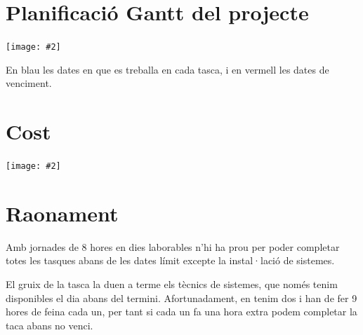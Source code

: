 \documentclass[a4paper,12pt]{article}
\newcommand{\mygraphic}[2][width=0.9\textwidth]{\begin{center}
		\centering\texttt{[image: \#2]}\par
\end{center}}
\begin{document}


\section{Planificació Gantt del projecte}
\mygraphic{gantt.pdf}
En blau les dates en que es treballa en cada tasca, i en vermell les dates de venciment. 

\section{Cost}
\mygraphic{factura.pdf}

\section{Raonament}
Amb jornades de 8 hores en dies laborables n'hi ha prou per poder completar totes les tasques abans de les dates límit excepte la instal·lació de sistemes.

El gruix de la tasca la duen a terme els tècnics de sistemes, que només tenim disponibles el dia abans del termini.
Afortunadament, en tenim dos i han de fer 9 hores de feina cada un, per tant si cada un fa una hora extra podem completar la taca abans no venci.
\end{document}
